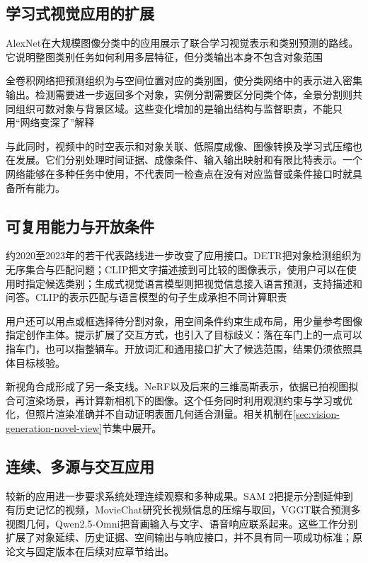 \subsection{学习式视觉应用的扩展}
\label{sec:vision-overview-learned-history}

AlexNet在大规模图像分类中的应用展示了联合学习视觉表示和类别预测的路线。它说明整图类别任务如何利用多层特征，但分类输出本身不包含对象范围

全卷积网络把预测组织为与空间位置对应的类别图，使分类网络中的表示进入密集输出。检测需要进一步返回多个对象，实例分割需要区分同类个体，全景分割则共同组织可数对象与背景区域。这些变化增加的是输出结构与监督职责，不能只用“网络变深了”解释

与此同时，视频中的时空表示和对象关联、低照度成像、图像转换及学习式压缩也在发展。它们分别处理时间证据、成像条件、输入输出映射和有限比特表示。一个网络能够在多种任务中使用，不代表同一检查点在没有对应监督或条件接口时就具备所有能力。

\subsection{可复用能力与开放条件}
\label{sec:vision-overview-open-history}

约2020至2023年的若干代表路线进一步改变了应用接口。DETR把对象检测组织为无序集合与匹配问题；CLIP把文字描述接到可比较的图像表示，使用户可以在使用时指定候选类别；生成式视觉语言模型则把视觉信息接入语言预测，支持描述和问答。CLIP的表示匹配与语言模型的句子生成承担不同计算职责

用户还可以用点或框选择待分割对象，用空间条件约束生成布局，用少量参考图像指定创作主体。提示扩展了交互方式，也引入了目标歧义：落在车门上的一点可以指车门，也可以指整辆车。开放词汇和通用接口扩大了候选范围，结果仍须依照具体目标核验。

新视角合成形成了另一条支线。NeRF以及后来的三维高斯表示，依据已拍视图拟合可渲染场景，再计算新相机下的图像。这个任务同时利用观测约束与学习或优化，但照片渲染准确并不自动证明表面几何适合测量。相关机制在\ref{sec:vision-generation-novel-view}节集中展开。

\subsection{连续、多源与交互应用}
\label{sec:vision-overview-continuous-history}

较新的应用进一步要求系统处理连续观察和多种成果。SAM 2把提示分割延伸到有历史记忆的视频，MovieChat研究长视频信息的压缩与取回，VGGT联合预测多视图几何，Qwen2.5-Omni把音画输入与文字、语音响应联系起来。这些工作分别扩展了对象延续、历史证据、空间输出与响应接口，并不具有同一项成功标准；原论文与固定版本在后续对应章节给出。

